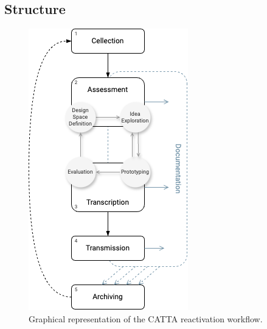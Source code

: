\subsection{Structure}
\begin{figure}[!h]
    \centering
    \includegraphics[width=0.7\linewidth]{chapters/3-mdc_model-reactivation_workflow-instruction_template/image/graph03-catta.png}
    \caption{Graphical representation of the CATTA reactivation workflow.}
    \label{fig:c3-catta}
\end{figure} 

